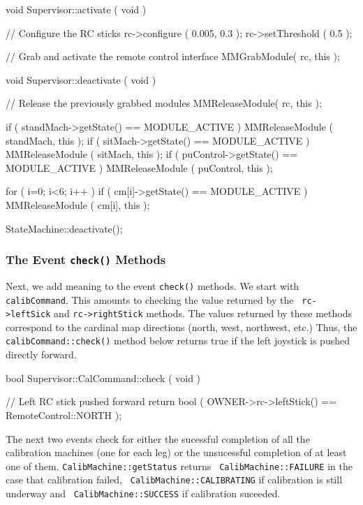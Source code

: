\begin{codesegment}
void Supervisor::activate ( void ) {

  // Configure the RC sticks
  rc->configure ( 0.005, 0.3 );
  rc->setThreshold ( 0.5 );

  // Grab and activate the remote control interface
  MMGrabModule( rc, this );

}

void Supervisor::deactivate ( void ) {

  // Release the previously grabbed modules
  MMReleaseModule( rc, this );

  if ( standMach->getState() == MODULE_ACTIVE ) MMReleaseModule ( standMach, this );
  if ( sitMach->getState() == MODULE_ACTIVE ) MMReleaseModule ( sitMach, this );
  if ( puControl->getState() == MODULE_ACTIVE ) MMReleaseModule ( puControl, this );

  for ( i=0; i<6; i++ )
    if ( cm[i]->getState() == MODULE_ACTIVE ) MMReleaseModule ( cm[i], this );

  StateMachine::deactivate();

}
\end{codesegment}

\subsubsection{The Event {\tt check()} Methods}

Next, we add meaning to the event {\tt check()} methods. We start with {\tt
calibCommand}. This amounts to checking the value returned by the {\tt
rc->leftSick} and {\tt rc->rightStick} methods. The values returned by these
methods correspond to the cardinal map directions (north, west, northwest, etc.)
Thus, the {\tt calibCommand::check()} method below returns true if the left
joystick is pushed directly forward.

\begin{codesegment}
bool Supervisor::CalCommand::check ( void ) { 

  // Left RC stick pushed forward
 return bool ( OWNER->rc->leftStick() == RemoteControl::NORTH );

}
\end{codesegment}

\noindent The next two events check for either the sucessful completion of all the
calibration machines (one for each leg) or the unsucessful completion of at
least one of them. {\tt CalibMachine::getStatus} returns {\tt
CalibMachine::FAILURE} in the case that calibration failed, {\tt
CalibMachine::CALIBRATING} if calibration is still underway and {\tt
CalibMachine::SUCCESS} if calibration suceeded.

